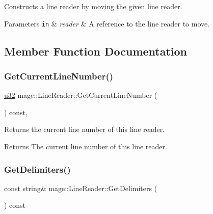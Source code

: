 Constructs a line reader by moving the given line reader.


\begin{DoxyParams}[1]{Parameters}
\mbox{\tt in}  & {\em reader} & A reference to the line reader to move. \\
\hline
\end{DoxyParams}


\subsection{Member Function Documentation}
\hypertarget{classmage_1_1_line_reader_a0a5d75bd999e4cf9611d3b4238d6ab50}{}\label{classmage_1_1_line_reader_a0a5d75bd999e4cf9611d3b4238d6ab50} 
\subsubsection{\texorpdfstring{Get\+Current\+Line\+Number()}{GetCurrentLineNumber()}}
{\footnotesize\ttfamily \hyperlink{namespacemage_af2b398bf98eb10351f49cad73fe2cc73}{u32} mage\+::\+Line\+Reader\+::\+Get\+Current\+Line\+Number (\begin{DoxyParamCaption}{ }\end{DoxyParamCaption}) const\hspace{0.3cm}{\ttfamily [protected]}, {\ttfamily [noexcept]}}

Returns the current line number of this line reader.

\begin{DoxyReturn}{Returns}
The current line number of this line reader. 
\end{DoxyReturn}
\hypertarget{classmage_1_1_line_reader_aa00e1e27b614e11ec9f70e52d0bac551}{}\label{classmage_1_1_line_reader_aa00e1e27b614e11ec9f70e52d0bac551} 
\subsubsection{\texorpdfstring{Get\+Delimiters()}{GetDelimiters()}}
{\footnotesize\ttfamily const string\& mage\+::\+Line\+Reader\+::\+Get\+Delimiters (\begin{DoxyParamCaption}{ }\end{DoxyParamCaption}) const\hspace{0.3cm}{\ttfamily [noexcept]}}

